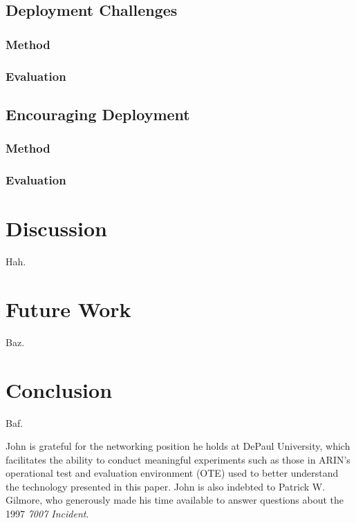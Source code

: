 \documentclass[sigconf]{acmart}
\begin{document}
\subsection{Deployment Challenges}
\subsubsection{Method}
\subsubsection{Evaluation}

\subsection{Encouraging Deployment}
\subsubsection{Method}
\subsubsection{Evaluation}

\section{Discussion}\label{sec:Discussion}

Hah.

\section{Future Work}\label{sec:Future Work}

Baz.

\section{Conclusion}\label{sec:Conclusion}

Baf.

\begin{acks}

John is grateful for the networking position he holds at DePaul
University, which facilitates the ability to conduct meaningful
experiments such as those in ARIN's operational test and evaluation
environment (OTE) used to better understand the technology presented in
this paper.  John is also indebted to Patrick W.  Gilmore, who
generously made his time available to answer questions about the 1997
\emph{7007 Incident}.

\end{acks}


\end{document}
